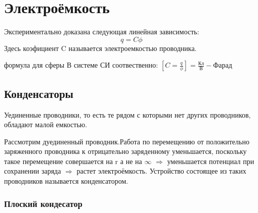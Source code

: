 \documentclass[../main.tex]{subfiles}
\begin{document}
\section{Электроёмкость}
Экспериментально доказана следующая линейная зависимость:
\[q = C \phi\]
Здесь коэфициент C называется электроемкостью проводника.

формула для сферы
В системе СИ соотвественно: $[C = \frac{q}{\phi}] = \frac{\text{Кл}}{\text{В}} - Фарад$ 
\subsection{Конденсаторы}
Уединенные проводники, то есть те рядом с которыми нет других проводников, обладают малой емкостью.

Рассмотрим дуединенный проводник.Работа по перемещению от положительно заряженного проводника к отрицательно заряденному уменьшается, поскольку
такое перемещение совершается на r а не на $\infty$ $\Rightarrow$ уменьшается потенциал при сохранении заряда $\Rightarrow$
растет электроёмкость.
Устройство состоящее из таких проводников называется конденсатором.


\subsubsection{Плоский кондесатор}
\end{document}
